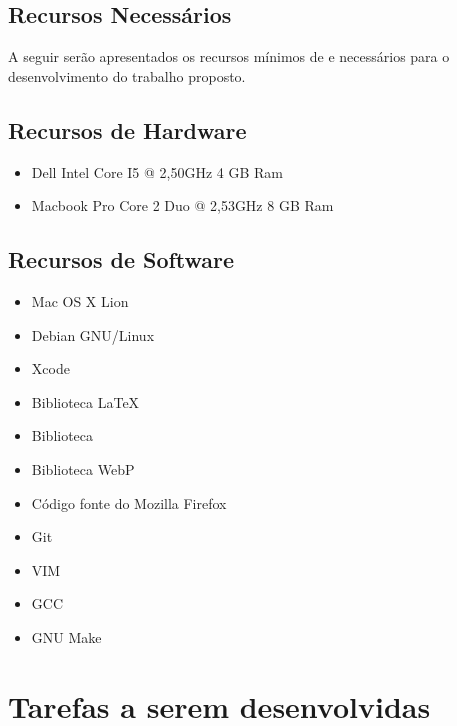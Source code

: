 \documentclass[espaco=simples,appendix=Name]{abnt}
\begin{document}
\begin{description}
\chapter{Recursos Necessários}
A seguir serão apresentados os recursos mínimos de  e  necessários para o desenvolvimento do trabalho proposto.

\section{Recursos de Hardware}
\begin{itemize}
	\item Dell Intel Core I5 @ 2,50GHz 4 GB Ram
	\item Macbook Pro Core 2 Duo @ 2,53GHz 8 GB Ram	
\end{itemize}
	
\section{Recursos de Software}
\begin{itemize}
	\item Mac OS X Lion
	\item Debian GNU/Linux
	\item Xcode
	\item Biblioteca \LaTeX
	\item Biblioteca \bibTeX
	\item Biblioteca WebP
	\item Código fonte do Mozilla Firefox
	\item Git
	\item VIM
	\item GCC
	\item GNU Make
\end{itemize}

\end{description}

\chapter{Tarefas a serem desenvolvidas}
\end{document}
